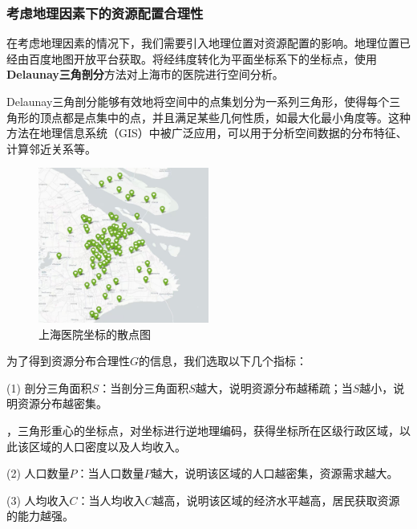 \documentclass[12pt,a4paper]{article}
\begin{document}
\begin{multicols}{2}
\subsubsection{考虑地理因素下的资源配置合理性}

在考虑地理因素的情况下，我们需要引入地理位置对资源配置的影响。地理位置已经由百度地图开放平台获取。将经纬度转化为平面坐标系下的坐标点，使用\textbf{Delaunay三角剖分}方法对上海市的医院进行空间分析。

Delaunay三角剖分能够有效地将空间中的点集划分为一系列三角形，使得每个三角形的顶点都是点集中的点，并且满足某些几何性质，如最大化最小角度等。这种方法在地理信息系统（GIS）中被广泛应用，可以用于分析空间数据的分布特征、计算邻近关系等。

\begin{figure}[H] %
\centering %
\includegraphics[width=0.5\textwidth]{images/shanghai_hospital_location.jpg} %
\caption{上海医院坐标的散点图} %
\label{Fig.main2} %
\end{figure}

为了得到资源分布合理性$G$的信息，我们选取以下几个指标：

(1) 剖分三角面积$S$：当剖分三角面积$S$越大，说明资源分布越稀疏；当$S$越小，说明资源分布越密集。

，三角形重心的坐标点，对坐标进行逆地理编码，获得坐标所在区级行政区域，以此该区域的人口密度以及人均收入。
\normalfont

(2) 人口数量$P$：当人口数量$P$越大，说明该区域的人口越密集，资源需求越大。

(3) 人均收入$C$：当人均收入$C$越高，说明该区域的经济水平越高，居民获取资源的能力越强。


\end{multicols}
\end{document}
